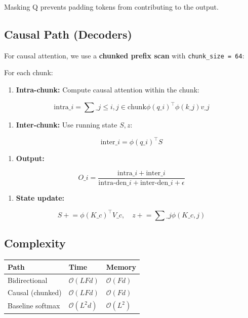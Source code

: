 Masking Q prevents padding tokens from contributing to the output.

\subsection{Causal Path (Decoders)}

For causal attention, we use a \textbf{chunked prefix scan} with \texttt{chunk\_size = 64}:

For each chunk:

\begin{enumerate}
\item \textbf{Intra-chunk:} Compute causal attention within the chunk:

\end{enumerate}
\[
\text{intra}\_i = \sum\_{j \leq i, j \in \text{chunk}} \phi(q\_i)^\top \phi(k\_j) v\_j
\tag{4.3}
\]

\begin{enumerate}
\item \textbf{Inter-chunk:} Use running state $S, z$:

\end{enumerate}
\[
\text{inter}\_i = \phi(q\_i)^\top S
\tag{4.4}
\]

\begin{enumerate}
\item \textbf{Output:}

\end{enumerate}
\[
O\_i = \frac{\text{intra}\_i + \text{inter}\_i}{\text{intra-den}\_i + \text{inter-den}\_i + \epsilon}
\tag{4.5}
\]

\begin{enumerate}
\item \textbf{State update:}

\end{enumerate}
\[
S \mathrel{+}= \phi(K\_c)^\top V\_c, \quad z \mathrel{+}= \sum\_j \phi(K\_{c,j})
\tag{4.6}
\]

\subsection{Complexity}

\begin{table}[H]
\centering
\small
\begin{tabular}{lll}
\toprule
\textbf{Path} & \textbf{Time} & \textbf{Memory} \\
\midrule
Bidirectional & $\mathcal{O}(L F d)$ & $\mathcal{O}(F d)$ \\
Causal (chunked) & $\mathcal{O}(L F d)$ & $\mathcal{O}(F d)$ \\
Baseline softmax & $\mathcal{O}(L^2 d)$ & $\mathcal{O}(L^2)$ \\
\bottomrule
\end{tabular}
\end{table}

